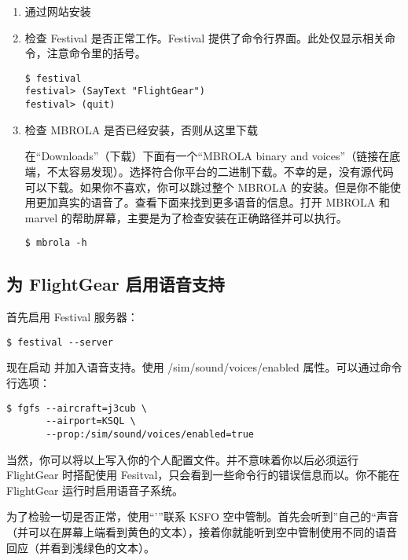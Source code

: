 \begin{enumerate}
\item 通过网站安装

\item 检查 Festival 是否正常工作。Festival 提供了命令行界面。此处仅显示相关命令，注意命令里的括号。

\begin{verbatim}
$ festival
festival> (SayText "FlightGear")
festival> (quit)
\end{verbatim}

\item 检查 MBROLA 是否已经安装，否则从这里下载


在“Downloads”（下载）下面有一个“MBROLA binary and voices”（链接在底端，不太容易发现）。选择符合你平台的二进制下载。不幸的是，没有源代码可以下载。如果你不喜欢，你可以跳过整个 MBROLA 的安装。但是你不能使用更加真实的语音了。查看下面来找到更多语音的信息。打开 MBROLA 和 marvel 的帮助屏幕，主要是为了检查安装在正确路径并可以执行。

\begin{verbatim}
$ mbrola -h
\end{verbatim}
\end{enumerate}

\subsection{为 FlightGear 启用语音支持}

首先启用 Festival 服务器：

\begin{verbatim}
$ festival --server
\end{verbatim}

现在启动 \FlightGear{} 并加入语音支持。使用 /sim/sound/voices/enabled 属性。可以通过命令行选项：

\begin{verbatim}
$ fgfs --aircraft=j3cub \
       --airport=KSQL \
       --prop:/sim/sound/voices/enabled=true
\end{verbatim}

当然，你可以将以上写入你的个人配置文件。并不意味着你以后必须运行 FlightGear 时搭配使用 Fesitval，只会看到一些命令行的错误信息而以。你不能在 FlightGear 运行时启用语音子系统。

为了检验一切是否正常，使用“'”联系 KSFO 空中管制。首先会听到”自己的“声音（并可以在屏幕上端看到黄色的文本），接着你就能听到空中管制使用不同的语音回应（并看到浅绿色的文本）。

